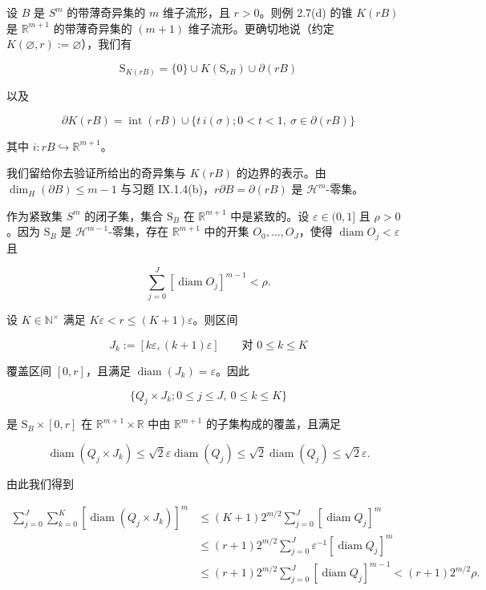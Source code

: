 \begin{example}
\begin{items}
设 $ B $ 是 $ S^m $ 的带薄奇异集的 $ m $ 维子流形，且 $ r > 0 $。则例 2.7(d) 的锥 $ K(rB) $ 是 $ \mathbb{R}^{m+1} $ 的带薄奇异集的 $ (m+1) $ 维子流形。更确切地说（约定 $ K(\varnothing, r) := \varnothing $），我们有

\[
\mathrm{S}_{K(rB)} = \{0\} \cup K(\mathrm{S}_{rB}) \cup \partial(rB)
\]

以及

\[
\partial K(rB) = \operatorname{int}(rB) \cup \{ t\,i(\sigma) ; 0 < t < 1,\ \sigma \in \partial(rB) \}
\]

其中 $ i: rB \hookrightarrow \mathbb{R}^{m+1} $。

\end{items}


\proofhead
我们留给你去验证所给出的奇异集与 $ K(rB) $ 的边界的表示。由 $ \dim_H(\partial B) \le m-1 $ 与习题 IX.1.4(b)，$ r\partial B = \partial(rB) $ 是 $ \mathcal{H}^m $-零集。

作为紧致集 $ S^m $ 的闭子集，集合 $ \mathrm{S}_B $ 在 $ \mathbb{R}^{m+1} $ 中是紧致的。设 $ \varepsilon \in (0,1] $ 且 $ \rho > 0 $。因为 $ \mathrm{S}_B $ 是 $ \mathcal{H}^{m-1} $-零集，存在 $ \mathbb{R}^{m+1} $ 中的开集 $ O_0, \ldots, O_J $，使得 $ \operatorname{diam} O_j < \varepsilon $ 且

\[
\sum_{j=0}^{J} [\operatorname{diam} O_j]^{m-1} < \rho.
\]

设 $ K \in \mathbb{N}^\times $ 满足 $ K\varepsilon < r \le (K+1)\varepsilon $。则区间

\[
J_k := [k\varepsilon, (k+1)\varepsilon] \qquad \text{对 } 0 \le k \le K
\]

覆盖区间 $ [0,r] $，且满足 $ \operatorname{diam}(J_k) = \varepsilon $。因此

\[
\{ Q_j \times J_k ; 0 \le j \le J,\ 0 \le k \le K \}
\]

是 $ \mathrm{S}_B \times [0,r] $ 在 $ \mathbb{R}^{m+1} \times \mathbb{R} $ 中由 $ \mathbb{R}^{m+1} $ 的子集构成的覆盖，且满足

\[
\operatorname{diam}(Q_j \times J_k) \le \sqrt{2}\varepsilon\operatorname{diam}(Q_j) \le \sqrt{2}\operatorname{diam}(Q_j) \le \sqrt{2}\varepsilon.
\]

由此我们得到

\begin{equation*}
\begin{aligned}
\sum_{j=0}^{J}\sum_{k=0}^{K} [\operatorname{diam}(Q_j \times J_k)]^m &\le (K+1)2^{m/2}\sum_{j=0}^{J}[\operatorname{diam} Q_j]^m \\ &\le (r+1)2^{m/2}\sum_{j=0}^{J}\varepsilon^{-1}[\operatorname{diam} Q_j]^m \\ &\le (r+1)2^{m/2}\sum_{j=0}^{J}[\operatorname{diam} Q_j]^{m-1} < (r+1)2^{m/2}\rho.
\end{aligned}
\end{equation*}


\end{example}
